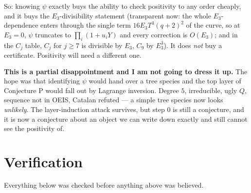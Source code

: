 \documentclass[11pt,a4paper]{article}
\theoremstyle{plain}
\theoremstyle{definition}
\begin{document}
So: knowing $\psi$ exactly buys the ability to check positivity to any order cheaply, and it
buys the $E_3$-divisibility statement (transparent now: the whole $E_3$-dependence enters
through the single term $16E_3T^3(q+2)^2$ of the curve, so at $E_3=0$, $\psi$ truncates to
$\prod_i(1+u_iY)$ and every correction is $O(E_3)$; and in the $C_j$ table, $C_j$ for
$j\ge7$ is divisible by $E_3$, $C_9$ by $E_3^3$). It does \emph{not} buy a certificate.
Positivity will need a different one.

\textbf{This is a partial disappointment and I am not going to dress it up.} The hope was
that identifying $\psi$ would hand over a tree species and the top layer of Conjecture P
would fall out by Lagrange inversion. Degree $5$, irreducible, ugly $Q$, sequence not in
OEIS, Catalan refuted --- a simple tree species now looks \emph{unlikely}. The
layer-induction attack survives, but step $0$ is still a conjecture, and it is now a
conjecture about an object we can write down exactly and still cannot see the positivity of.

\section{Verification}
\label{sec:verification}

Everything below was checked before anything above was believed.
\end{document}
